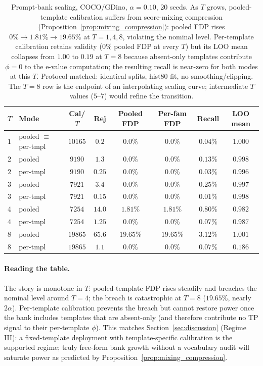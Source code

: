 \documentclass{article}
\theoremstyle{remark}
\newcommand{\1}{\mathbf{1}}
\begin{document}
\begin{table}[h]
\centering
\small
\begin{tabular*}{\linewidth}{@{\extracolsep{\fill}}llcccccc@{}}
\toprule
$T$ & Mode & Cal/$T$ & Rej & Pooled FDP & Per-fam FDP & Recall & LOO mean \\
\midrule
$1$ & pooled $\equiv$ per-tmpl & $10165$ & $0.2$  & $0.0\%$  & $0.0\%$  & $0.04\%$ & $1.000$ \\
$2$ & pooled    & $9190$ & $1.3$  & $0.0\%$  & $0.0\%$  & $0.13\%$ & $0.998$ \\
$2$ & per-tmpl  & $9190$ & $0.25$ & $0.0\%$  & $0.0\%$  & $0.03\%$ & $0.996$ \\
$3$ & pooled    & $7921$ & $3.4$  & $0.0\%$  & $0.0\%$  & $0.25\%$ & $0.997$ \\
$3$ & per-tmpl  & $7921$ & $0.15$ & $0.0\%$  & $0.0\%$  & $0.01\%$ & $0.998$ \\
$4$ & pooled    & $7254$ & $14.0$ & $1.81\%$ & $1.81\%$ & $0.80\%$ & $0.982$ \\
$4$ & per-tmpl  & $7254$ & $1.25$ & $0.0\%$  & $0.0\%$  & $0.07\%$ & $0.987$ \\
$8$ & pooled    & $19865$& $65.6$ & $\mathbf{19.65\%}$ & $19.65\%$ & $3.12\%$ & $1.001$ \\
$8$ & per-tmpl  & $19865$& $1.1$  & $0.0\%$  & $0.0\%$  & $0.07\%$ & $0.186$ \\
\bottomrule
\end{tabular*}
\caption{Prompt-bank scaling, COCO/GDino, $\alpha\!=\!0.10$, 20
seeds. As $T$ grows, pooled-template calibration suffers from
score-mixing compression (Proposition~\ref{prop:mixing_compression}):
pooled FDP rises $0\%\!\to\!1.81\%\!\to\!19.65\%$ at $T\!=\!1,4,8$,
violating the nominal level. Per-template calibration retains validity
($0\%$ pooled FDP at every $T$) but its LOO mean collapses from
$1.00$ to $0.19$ at $T\!=\!8$ because absent-only templates contribute
$\phi\!=\!0$ to the e-value computation; the resulting recall is
near-zero for both modes at this $T$. Protocol-matched: identical
splits, hist80 fit, no smoothing/clipping. The $T\!=\!8$ row is the
endpoint of an interpolating scaling curve; intermediate $T$ values
($5$--$7$) would refine the transition.}
\label{tab:prompt_bank}
\end{table}

\paragraph{Reading the table.}
The story is monotone in $T$: pooled-template FDP rises steadily and
breaches the nominal level around $T\!=\!4$; the breach is
catastrophic at $T\!=\!8$ ($19.65\%$, nearly $2\alpha$).
Per-template calibration prevents the breach but cannot restore power
once the bank includes templates that are absent-only (and therefore
contribute no TP signal to their per-template $\phi$). This matches
Section~\ref{sec:discussion} (Regime III): a fixed-template deployment with
template-specific calibration is the supported regime; truly
free-form bank growth without a vocabulary audit will saturate
power as predicted by Proposition~\ref{prop:mixing_compression}.
\end{document}
